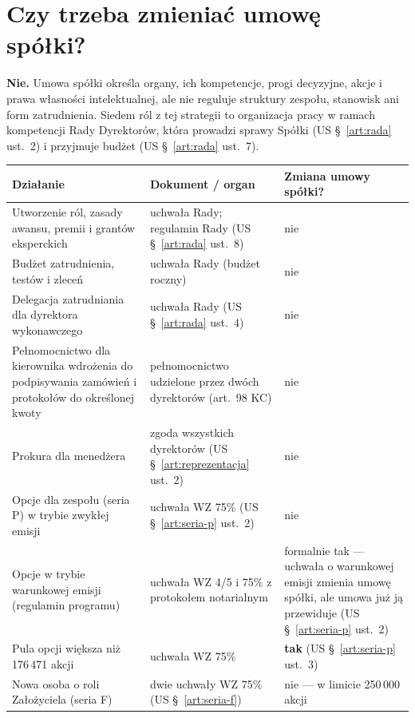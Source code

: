 \documentclass[11pt,a4paper]{report}
\newcommand{\US}[1]{US §~#1}
\begin{document}
\section{Czy trzeba zmieniać umowę spółki?}
\label{sec:zmiany}

\textbf{Nie.} Umowa spółki określa organy, ich kompetencje, progi decyzyjne, akcje i prawa własności intelektualnej, ale nie reguluje struktury zespołu, stanowisk ani form zatrudnienia. Siedem ról z tej strategii to organizacja pracy w ramach kompetencji Rady Dyrektorów, która prowadzi sprawy Spółki (\US{\ref{art:rada} ust.~2}) i przyjmuje budżet (\US{\ref{art:rada} ust.~7}).

\begin{center}
\small
\begin{tabularx}{\linewidth}{@{}>{\raggedright\arraybackslash}X >{\raggedright\arraybackslash}p{3.6cm} >{\raggedright\arraybackslash}p{4.0cm}@{}}
\toprule
\textbf{Działanie} & \textbf{Dokument / organ} & \textbf{Zmiana umowy spółki?} \\
\midrule
Utworzenie ról, zasady awansu, premii i grantów eksperckich & uchwała Rady; regulamin Rady (\US{\ref{art:rada} ust.~8}) & nie \\
Budżet zatrudnienia, testów i zleceń & uchwała Rady (budżet roczny) & nie \\
Delegacja zatrudniania dla dyrektora wykonawczego & uchwała Rady (\US{\ref{art:rada} ust.~4}) & nie \\
Pełnomocnictwo dla kierownika wdrożenia do podpisywania zamówień i protokołów do określonej kwoty & pełnomocnictwo udzielone przez dwóch dyrektorów (art.~98 KC) & nie \\
Prokura dla menedżera & zgoda wszystkich dyrektorów (\US{\ref{art:reprezentacja} ust.~2}) & nie \\
Opcje dla zespołu (seria P) w trybie zwykłej emisji & uchwała WZ 75\% (\US{\ref{art:seria-p} ust.~2}) & nie \\
Opcje w trybie warunkowej emisji (regulamin programu) & uchwała WZ 4/5 i 75\% z protokołem notarialnym & formalnie tak --- uchwała o warunkowej emisji zmienia umowę spółki, ale umowa już ją przewiduje (\US{\ref{art:seria-p} ust.~2}) \\
Pula opcji większa niż 176\,471 akcji & uchwała WZ 75\% & \textbf{tak} (\US{\ref{art:seria-p} ust.~3}) \\
Nowa osoba o roli Założyciela (seria F) & dwie uchwały WZ 75\% (\US{\ref{art:seria-f}}) & nie --- w limicie 250\,000 akcji \\

\end{tabularx}
\end{center}
\end{document}
